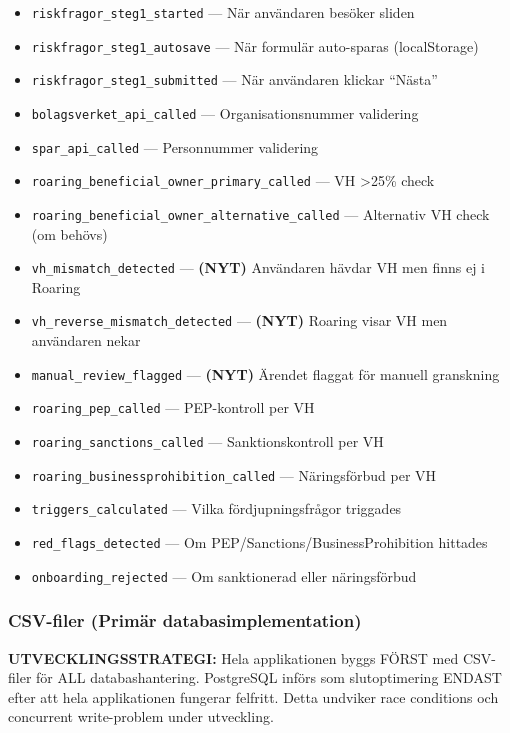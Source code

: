 \documentclass[12pt,a4paper]{article}
\begin{document}
\begin{itemize}[noitemsep]
  \item \texttt{riskfragor\_steg1\_started} — När användaren besöker sliden
  \item \texttt{riskfragor\_steg1\_autosave} — När formulär auto-sparas (localStorage)
  \item \texttt{riskfragor\_steg1\_submitted} — När användaren klickar \enquote{Nästa}
  \item \texttt{bolagsverket\_api\_called} — Organisationsnummer validering
  \item \texttt{spar\_api\_called} — Personnummer validering
  \item \texttt{roaring\_beneficial\_owner\_primary\_called} — VH >25\% check
  \item \texttt{roaring\_beneficial\_owner\_alternative\_called} — Alternativ VH check (om behövs)
  \item \texttt{vh\_mismatch\_detected} — \textbf{(NYT)} Användaren hävdar VH men finns ej i Roaring
  \item \texttt{vh\_reverse\_mismatch\_detected} — \textbf{(NYT)} Roaring visar VH men användaren nekar
  \item \texttt{manual\_review\_flagged} — \textbf{(NYT)} Ärendet flaggat för manuell granskning
  \item \texttt{roaring\_pep\_called} — PEP-kontroll per VH
  \item \texttt{roaring\_sanctions\_called} — Sanktionskontroll per VH
  \item \texttt{roaring\_businessprohibition\_called} — Näringsförbud per VH
  \item \texttt{triggers\_calculated} — Vilka fördjupningsfrågor triggades
  \item \texttt{red\_flags\_detected} — Om PEP/Sanctions/BusinessProhibition hittades
  \item \texttt{onboarding\_rejected} — Om sanktionerad eller näringsförbud
\end{itemize}

\subsubsection{CSV-filer (Primär databasimplementation)}

\textbf{UTVECKLINGSSTRATEGI:} Hela applikationen byggs FÖRST med CSV-filer för ALL databashantering. PostgreSQL införs som slutoptimering ENDAST efter att hela applikationen fungerar felfritt. Detta undviker race conditions och concurrent write-problem under utveckling.
\end{document}
